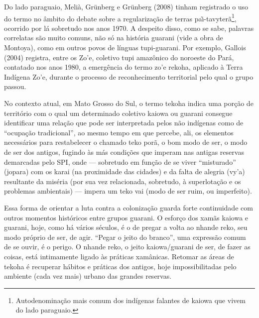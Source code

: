 \documentclass{article}
\begin{document}
Do lado paraguaio, Meli\`a, Gr\"unberg e Gr\"unberg (2008) tinham
registrado o uso do termo no \^ambito do debate sobre a
regulariza\c{c}\~ao de terras pa\~\i{}-tavyter\~a\footnote{
Autodenomina\c{c}\~ao mais comum dos ind\'igenas falantes de kaiowa que
vivem do lado paraguaio.}, ocorrido por l\'a sobretudo nos anos 1970. A
despeito disso, como se sabe, palavras correlatas s\~ao muito comuns,
n\~ao s\'o na hist\'oria guarani (vide a obra de Montoya), como em
outros povos de l\'inguas tupi-guarani. Por exemplo, Gallois (2004)
registra, entre os Zo{\textquoteright}e, coletivo tupi amaz\^onico do
noroeste do Par\'a, contatado nos anos 1980, a emerg\^encia do termo
zo{\textquoteright}e rekoha, aplicado \`a Terra Ind\'igena
Zo{\textquoteright}e, durante o processo de reconhecimento territorial
pelo qual o grupo passou. 

No contexto atual, em Mato Grosso do Sul, o termo tekoha indica uma
por\c{c}\~ao de territ\'orio com o qual um determinado coletivo kaiowa
ou guarani consegue identificar uma rela\c{c}\~ao que pode ser
interpretada pelos n\~ao ind\'igenas como de
{\textquotedblleft}ocupa\c{c}\~ao tradicional{\textquotedblright}, ao
mesmo tempo em que percebe, ali, os elementos necess\'arios para
restabelecer o chamado teko por\~a, o bom modo de ser, o modo de ser
dos antigos, fugindo \`as m\'as condi\c{c}\~oes que imperam nas antigas
reservas demarcadas pelo SPI, onde --- sobretudo em fun\c{c}\~ao de se
viver {\textquotedblleft}misturado{\textquotedblright} (jopara) com os
karai (na proximidade das cidades) e da falta de alegria
(vy{\textquoteright}a) resultante da mis\'eria (por sua vez
relacionada, sobretudo, \`a superlota\c{c}\~ao e os problemas
ambientais) --- impera um teko vai (modo de ser ruim, ou imperfeito).

Essa forma de orientar a luta contra a coloniza\c{c}\~ao guarda forte
continuidade com outros momentos hist\'oricos entre grupos guarani. O
esfor\c{c}o dos xam\~as kaiowa e guarani, hoje, como h\'a v\'arios
s\'eculos, \'e o de pregar a volta ao nhande reko, seu modo pr\'oprio
de ser, de agir. {\textquotedblleft}Pegar o jeito do
branco{\textquotedblright}, uma express\~ao comum de se ouvir, \'e o
perigo. O nhande reko, o jeito kaiowa/guarani de ser, de fazer as
coisas, est\'a intimamente ligado \`as pr\'aticas xam\^anicas. Retomar
as \'areas de tekoha \'e recuperar h\'abitos e pr\'aticas dos antigos,
hoje impossibilitadas pelo ambiente (cada vez mais) urbano das grandes
reservas.
\end{document}
